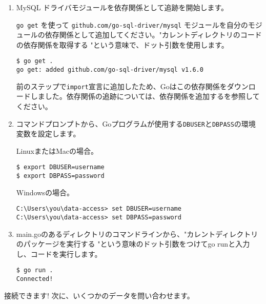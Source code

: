 \begin{enumerate}
\item MySQL ドライバモジュールを依存関係として追跡を開始します。

\texttt{go get} を使って \texttt{github.com/go-sql-driver/mysql} モジュールを自分のモジュールの依存関係として追加してください。"カレントディレクトリのコードの依存関係を取得する "という意味で、ドット引数を使用します。

\begin{lstlisting}[numbers=none]
$ go get .
go get: added github.com/go-sql-driver/mysql v1.6.0
\end{lstlisting}

前のステップで\texttt{import}宣言に追加したため、Goはこの依存関係をダウンロードしました。依存関係の追跡については、依存関係を追加するを参照してください。

\item コマンドプロンプトから、Goプログラムが使用する\texttt{DBUSER}と\texttt{DBPASS}の環境変数を設定します。

LinuxまたはMacの場合。

\begin{lstlisting}[numbers=none]
$ export DBUSER=username
$ export DBPASS=password
\end{lstlisting}

Windowsの場合。

\begin{lstlisting}[numbers=none]
C:\Users\you\data-access> set DBUSER=username
C:\Users\you\data-access> set DBPASS=password
\end{lstlisting}

\item main.goのあるディレクトリのコマンドラインから、"カレントディレクトリのパッケージを実行する "という意味のドット引数をつけてgo runと入力し、コードを実行します。

\begin{lstlisting}[numbers=none]
$ go run .
Connected!
\end{lstlisting}

\end{enumerate}

接続できます! 次に、いくつかのデータを問い合わせます。
